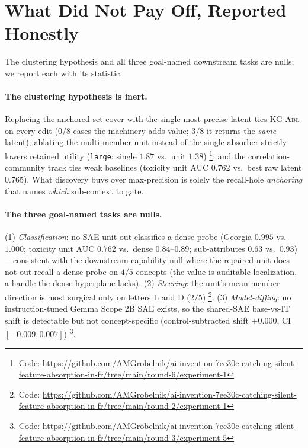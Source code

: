 \documentclass[11pt,letterpaper]{article}
\begin{document}
\section{What Did Not Pay Off, Reported Honestly}
\label{sec:nulls}

The clustering hypothesis and all three goal-named downstream tasks are nulls; we report each with its statistic.

\paragraph{The clustering hypothesis is inert.} Replacing the anchored set-cover with the single most precise latent ties \textsc{KG-Abl} on every edit ($0/8$ cases the machinery adds value; $3/8$ it returns the \emph{same} latent); ablating the multi-member unit instead of the single absorber strictly lowers retained utility (\texttt{large}: single $1.87$ vs.\ unit $1.38$) \footnote{Code: \url{https://github.com/AMGrobelnik/ai-invention-7ee30c-catching-silent-feature-absorption-in-fr/tree/main/round-6/experiment-1}}; and the correlation-community track ties weak baselines (toxicity unit AUC $0.762$ vs.\ best raw latent $0.765$). What discovery buys over max-precision is solely the recall-hole \emph{anchoring} that names \emph{which} sub-context to gate.

\paragraph{The three goal-named tasks are nulls.} (1) \emph{Classification}: no SAE unit out-classifies a dense probe (Georgia $0.995$ vs.\ $1.000$; toxicity unit AUC $0.762$ vs.\ dense $0.84$--$0.89$; sub-attributes $0.63$ vs.\ $0.93$)---consistent with the downstream-capability null where the repaired unit does not out-recall a dense probe on $4/5$ concepts (the value is auditable localization, a handle the dense hyperplane lacks). (2) \emph{Steering}: the unit's mean-member direction is most surgical only on letters L and D ($2/5$) \footnote{Code: \url{https://github.com/AMGrobelnik/ai-invention-7ee30c-catching-silent-feature-absorption-in-fr/tree/main/round-2/experiment-1}}. (3) \emph{Model-diffing}: no instruction-tuned Gemma Scope 2B SAE exists, so the shared-SAE base-vs-IT shift is detectable but not concept-specific (control-subtracted shift $+0.000$, CI $[-0.009,0.007]$) \footnote{Code: \url{https://github.com/AMGrobelnik/ai-invention-7ee30c-catching-silent-feature-absorption-in-fr/tree/main/round-3/experiment-5}}.
\end{document}
